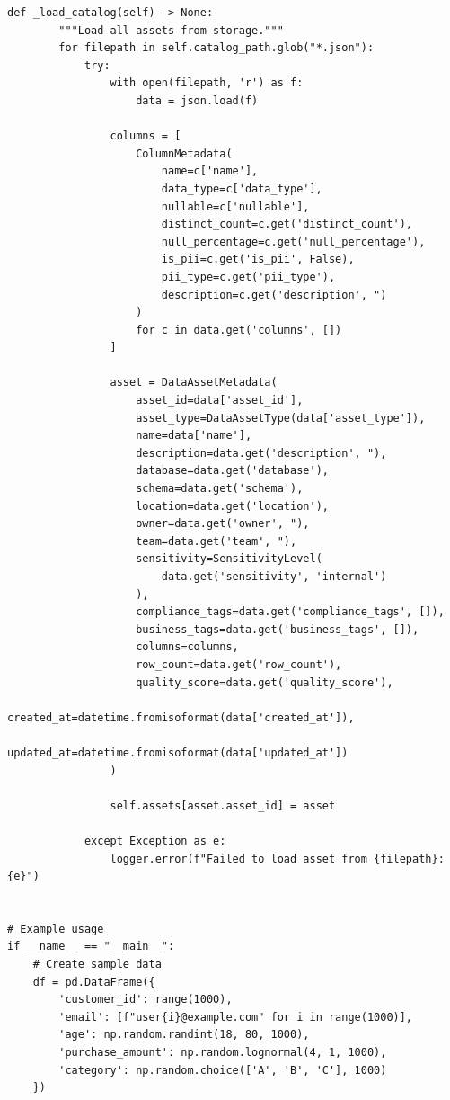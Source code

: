 \begin{lstlisting}[style=python, caption={Enterprise data catalog with automated metadata extraction}]
    def _load_catalog(self) -> None:
        """Load all assets from storage."""
        for filepath in self.catalog_path.glob("*.json"):
            try:
                with open(filepath, 'r') as f:
                    data = json.load(f)

                columns = [
                    ColumnMetadata(
                        name=c['name'],
                        data_type=c['data_type'],
                        nullable=c['nullable'],
                        distinct_count=c.get('distinct_count'),
                        null_percentage=c.get('null_percentage'),
                        is_pii=c.get('is_pii', False),
                        pii_type=c.get('pii_type'),
                        description=c.get('description', ")
                    )
                    for c in data.get('columns', [])
                ]

                asset = DataAssetMetadata(
                    asset_id=data['asset_id'],
                    asset_type=DataAssetType(data['asset_type']),
                    name=data['name'],
                    description=data.get('description', "),
                    database=data.get('database'),
                    schema=data.get('schema'),
                    location=data.get('location'),
                    owner=data.get('owner', "),
                    team=data.get('team', "),
                    sensitivity=SensitivityLevel(
                        data.get('sensitivity', 'internal')
                    ),
                    compliance_tags=data.get('compliance_tags', []),
                    business_tags=data.get('business_tags', []),
                    columns=columns,
                    row_count=data.get('row_count'),
                    quality_score=data.get('quality_score'),
                    created_at=datetime.fromisoformat(data['created_at']),
                    updated_at=datetime.fromisoformat(data['updated_at'])
                )

                self.assets[asset.asset_id] = asset

            except Exception as e:
                logger.error(f"Failed to load asset from {filepath}: {e}")


# Example usage
if __name__ == "__main__":
    # Create sample data
    df = pd.DataFrame({
        'customer_id': range(1000),
        'email': [f"user{i}@example.com" for i in range(1000)],
        'age': np.random.randint(18, 80, 1000),
        'purchase_amount': np.random.lognormal(4, 1, 1000),
        'category': np.random.choice(['A', 'B', 'C'], 1000)
    })


\end{lstlisting}
